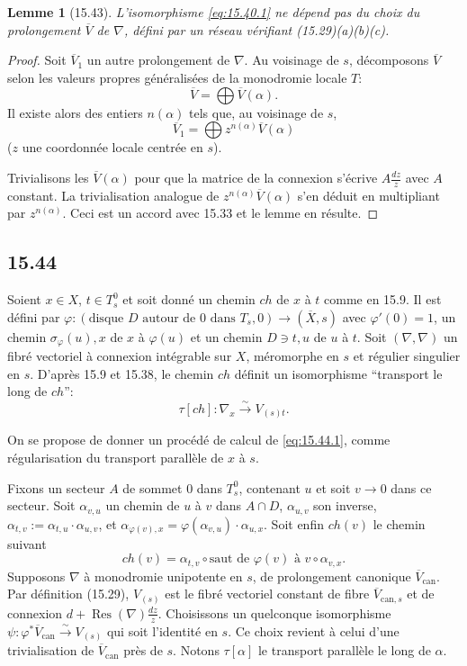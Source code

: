 \documentclass[12pt,a4paper]{article}
\theoremstyle{plain}
\newtheorem{lemma}[theorem]{Lemme}
\theoremstyle{definition}
\theoremstyle{remark}
\DeclareMathOperator{\Res}{Res}
\begin{document}
\begin{lemma}[15.43]
L'isomorphisme \eqref{eq:15.40.1} ne dépend pas du choix du prolongement $\overline{V}$ de $\nabla$, défini par un réseau vérifiant (15.29)(a)(b)(c).
\end{lemma}

\begin{proof}
Soit $\overline{V}_1$ un autre prolongement de $\nabla$. Au voisinage de $s$, décomposons $\overline{V}$ selon les valeurs propres généralisées de la monodromie locale $T$:
\[
\overline{V} = \bigoplus \overline{V}(\alpha).
\]
Il existe alors des entiers $n(\alpha)$ tels que, au voisinage de $s$,
\[
\overline{V}_1 = \bigoplus z^{n(\alpha)} \overline{V}(\alpha)
\]
($z$ une coordonnée locale centrée en $s$).

Trivialisons les $\overline{V}(\alpha)$ pour que la matrice de la connexion s'écrive $A \frac{dz}{z}$ avec $A$ constant. La trivialisation analogue de $z^{n(\alpha)} \overline{V}(\alpha)$ s'en déduit en multipliant par $z^{n(\alpha)}$. Ceci est un accord avec 15.33 et le lemme en résulte.
\end{proof}

\subsection*{15.44}

Soient $x \in X$, $t \in T_s^0$ et soit donné un chemin $ch$ de $x$ à $t$ comme en 15.9. Il est défini par $\varphi: (\text{disque } D \text{ autour de } 0 \text{ dans } T_s, 0) \to (\overline{X}, s)$ avec $\varphi'(0) = 1$, un chemin $\sigma_\varphi(u), x$ de $x$ à $\varphi(u)$ et un chemin $D \ni t, u$ de $u$ à $t$. Soit $(\nabla, \nabla)$ un fibré vectoriel à connexion intégrable sur $X$, méromorphe en $s$ et régulier singulier en $s$. D'après 15.9 et 15.38, le chemin $ch$ définit un isomorphisme ``transport le long de $ch$'':
\begin{equation}\label{eq:15.44.1}
\tau[ch]: \nabla_x \xrightarrow{\sim} V_{(s)t}.
\end{equation}

On se propose de donner un procédé de calcul de \eqref{eq:15.44.1}, comme régularisation du transport parallèle de $x$ à $s$.

Fixons un secteur $A$ de sommet $0$ dans $T_s^0$, contenant $u$ et soit $v \to 0$ dans ce secteur. Soit $\alpha_{v,u}$ un chemin de $u$ à $v$ dans $A \cap D$, $\alpha_{u,v}$ son inverse, $\alpha_{t,v} := \alpha_{t,u} \cdot \alpha_{u,v}$, et $\alpha_{\varphi(v), x} = \varphi(\alpha_{v,u}) \cdot \alpha_{u,x}$. Soit enfin $ch(v)$ le chemin suivant
\[
ch(v) = \alpha_{t,v} \circ \text{saut de } \varphi(v) \text{ à } v \circ \alpha_{v,x}.
\]
Supposons $\nabla$ à monodromie unipotente en $s$, de prolongement canonique $\overline{V}_{\text{can}}$. Par définition (15.29), $V_{(s)}$ est le fibré vectoriel constant de fibre $\overline{V}_{\text{can}, s}$ et de connexion $d + \Res(\nabla) \frac{dz}{z}$. Choisissons un quelconque isomorphisme $\psi: \varphi^* \overline{V}_{\text{can}} \xrightarrow{\sim} V_{(s)}$ qui soit l'identité en $s$. Ce choix revient à celui d'une trivialisation de $\overline{V}_{\text{can}}$ près de $s$. Notons $\tau[\alpha]$ le transport parallèle le long de $\alpha$.
\end{document}
